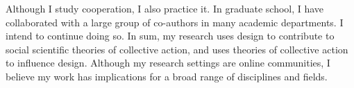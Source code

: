 \documentclass[10pt]{memoir}
\begin{document}
Although I study cooperation, I also practice it. In graduate school,
I have collaborated with a large group of co-authors in many academic
departments. I intend to continue doing so. In sum, my research uses
design to contribute to social scientific theories of collective
action, and uses theories of collective action to influence
design. Although my research settings are online communities, I
believe my work has implications for a broad range of disciplines and
fields.

\renewcommand{\bibsection}{\section{\bibname}\prebibhook}
\baselineskip 14.2pt


\end{document}
